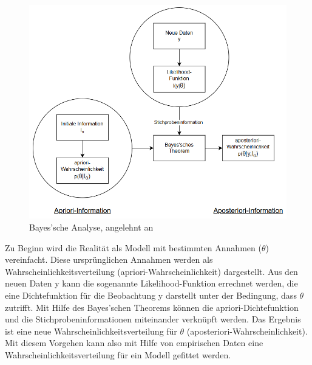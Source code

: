\begin{figure}[H]
	\centering
	\includegraphics[scale = 0.8]{Bilder/bayesianInterence.png}
	\caption{Bayes'sche Analyse, angelehnt an \cite{nenning_bayessche_1980}}
	\label{fig:bayesianInference}
\end{figure}

Zu Beginn wird die Realität als Modell mit bestimmten Annahmen ($\theta$) vereinfacht.
Diese ursprünglichen Annahmen werden als Wahrscheinlichkeitsverteilung (apriori-Wahrscheinlichkeit) dargestellt. 
Aus den neuen Daten y kann die sogenannte
Likelihood-Funktion errechnet werden, die eine Dichtefunktion für die Beobachtung y darstellt unter der Bedingung, dass $\theta$ zutrifft.
Mit Hilfe des Bayes'schen Theorems können die apriori-Dichtefunktion und die Stichprobeninformationen miteinander verknüpft werden.
Das Ergebnis ist eine neue Wahrscheinlichkeitsverteilung für $\theta$ (aposteriori-Wahrscheinlichkeit). \cite{nenning_bayessche_1980}
Mit diesem Vorgehen kann also mit Hilfe von empirischen Daten eine Wahrscheinlichkeitsverteilung für ein Modell gefittet werden.\\

